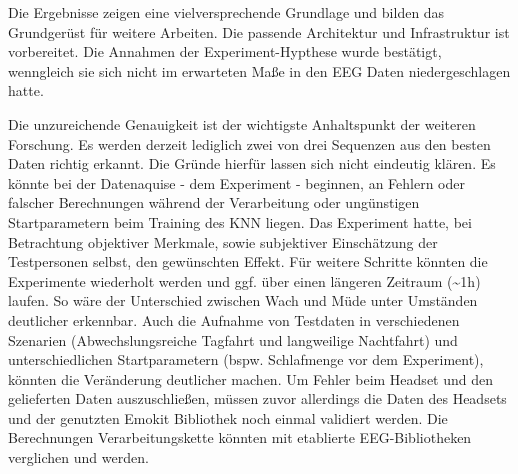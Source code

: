 \label{chap:conclusion}
Die Ergebnisse zeigen eine vielversprechende Grundlage und bilden das Grundgerüst für weitere Arbeiten. Die passende Architektur und Infrastruktur ist vorbereitet. Die Annahmen der Experiment-Hypthese wurde bestätigt, wenngleich sie sich nicht im erwarteten Maße in den EEG Daten niedergeschlagen hatte.

Die unzureichende Genauigkeit ist der wichtigste Anhaltspunkt der weiteren Forschung. Es werden derzeit lediglich zwei von drei Sequenzen aus den besten Daten richtig erkannt. 
Die Gründe hierfür lassen sich nicht eindeutig klären. Es könnte bei der Datenaquise - dem Experiment - beginnen, an Fehlern oder falscher Berechnungen während der Verarbeitung oder ungünstigen Startparametern beim Training des KNN liegen. Das Experiment hatte, bei Betrachtung objektiver Merkmale, sowie subjektiver Einschätzung der Testpersonen selbst, den gewünschten Effekt. Für weitere Schritte könnten die Experimente wiederholt werden und ggf. über einen längeren Zeitraum (\textasciitilde 1h) laufen. So wäre der Unterschied zwischen Wach und Müde unter Umständen deutlicher erkennbar. Auch die Aufnahme von Testdaten in verschiedenen Szenarien (Abwechslungsreiche Tagfahrt und langweilige Nachtfahrt) und unterschiedlichen Startparametern (bspw. Schlafmenge vor dem Experiment), könnten die Veränderung deutlicher machen.
Um Fehler beim Headset und den gelieferten Daten auszuschließen, 
müssen zuvor allerdings die Daten des Headsets und der genutzten Emokit Bibliothek noch einmal validiert werden.
Die Berechnungen Verarbeitungskette könnten mit etablierte EEG-Bibliotheken verglichen und werden. 